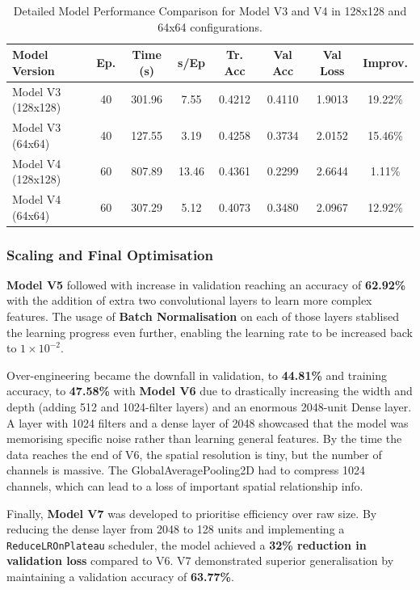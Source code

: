 \documentclass[a4paper,11pt]{article}
\begin{document}
\begin{table}[h]
\centering
\small %
\setlength{\tabcolsep}{3pt} %
\caption{Detailed Model Performance Comparison for Model V3 and V4 in 128x128 and 64x64 configurations.}
\label{tab:model_performance_v3_v4}
\begin{tabular}{|l|c|c|c|c|c|c|c|}
\hline
\textbf{Model Version} & \textbf{Ep.} & \textbf{Time (s)} & \textbf{s/Ep} & \textbf{Tr. Acc} & \textbf{Val Acc} & \textbf{Val Loss} & \textbf{Improv.} \\ \hline
Model V3 (128x128)     & 40 & 301.96 & 7.55  & 0.4212 & 0.4110 & 1.9013 & 19.22\% \\ \hline
Model V3 (64x64)       & 40 & 127.55 & 3.19  & 0.4258 & 0.3734 & 2.0152 & 15.46\% \\ \hline
Model V4 (128x128)     & 60 & 807.89 & 13.46 & 0.4361 & 0.2299 & 2.6644 & 1.11\%  \\ \hline
Model V4 (64x64)       & 60 & 307.29 & 5.12  & 0.4073 & 0.3480 & 2.0967 & 12.92\% \\ \hline
\end{tabular}
\end{table}

\subsubsection{Scaling and Final Optimisation}
\textbf{Model V5} followed with increase in validation reaching an accuracy of \textbf{62.92\%} with the addition of extra two convolutional layers to learn more complex features. The usage of \textbf{Batch Normalisation} on each of those layers stablised the learning progress even further, enabling the learning rate to be increased back to $1 \times 10^{-2}$.

Over-engineering became the downfall in validation, to \textbf{44.81\%} and training accuracy, to \textbf{47.58\%} with \textbf{Model V6} due to drastically increasing the width and depth (adding 512 and 1024-filter layers) and an enormous 2048-unit Dense layer. A layer with 1024 filters and a dense layer of 2048 showcased that the model was memorising specific noise rather than learning general features. By the time the data reaches the end of V6, the spatial resolution is tiny, but the number of channels is massive. The GlobalAveragePooling2D had to compress 1024 channels, which can lead to a loss of important spatial relationship info.

Finally, \textbf{Model V7} was developed to prioritise efficiency over raw size. By reducing the dense layer from 2048 to 128 units and implementing a \texttt{ReduceLROnPlateau} scheduler, the model achieved a \textbf{32\% reduction in validation loss} compared to V6. V7 demonstrated superior generalisation by maintaining a validation accuracy of \textbf{63.77\%}.
\end{document}
